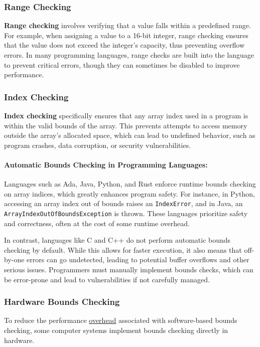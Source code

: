 \documentclass[12pt, oneside]{book}
\begin{document}
\subsubsection{Range Checking}
\textbf{Range checking} involves verifying that a value falls within a predefined range. For example, when assigning a value to a 16-bit integer, range checking ensures that the value does not exceed the integer's capacity, thus preventing overflow errors. In many programming languages, range checks are built into the language to prevent critical errors, though they can sometimes be disabled to improve performance.

\subsubsection{Index Checking}
\textbf{Index checking} specifically ensures that any array index used in a program is within the valid bounds of the array. This prevents attempts to access memory outside the array’s allocated space, which can lead to undefined behavior, such as program crashes, data corruption, or security vulnerabilities.

\paragraph{Automatic Bounds Checking in Programming Languages:}
Languages such as Ada, Java, Python, and Rust enforce runtime bounds checking on array indices, which greatly enhances program safety. For instance, in Python, accessing an array index out of bounds raises an \texttt{IndexError}, and in Java, an \texttt{ArrayIndexOutOfBoundsException} is thrown. These languages prioritize safety and correctness, often at the cost of some runtime overhead.

In contrast, languages like C and C++ do not perform automatic bounds checking by default. While this allows for faster execution, it also means that off-by-one errors can go undetected, leading to potential buffer overflows and other serious issues. Programmers must manually implement bounds checks, which can be error-prone and lead to vulnerabilities if not carefully managed.

\subsubsection{Hardware Bounds Checking}
To reduce the performance \href{https://en.wikipedia.org/wiki/Overhead_(computing)}{overhead} associated with software-based bounds checking, some computer systems implement bounds checking directly in hardware. 
\end{document}
